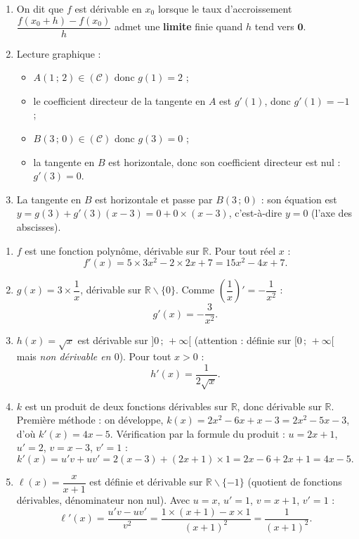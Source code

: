 \documentclass[11pt]{article}
\def\setminus{\mathbin{\backslash}}\let\smallsetminus\setminus
\begin{document}
\begin{corrige}
\begin{enumerate}
\item On dit que $f$ est dérivable en $x_0$ lorsque le taux d'accroissement $\dfrac{f(x_0+h)-f(x_0)}{h}$ admet une \textbf{limite} finie quand $h$ tend vers $\mathbf{0}$.
\item Lecture graphique :
\begin{itemize}
\item $A(1\,;\,2)\in(\mathcal{C})$ donc $g(1)=2$ ;
\item le coefficient directeur de la tangente en $A$ est $g'(1)$, donc $g'(1)=-1$ ;
\item $B(3\,;\,0)\in(\mathcal{C})$ donc $g(3)=0$ ;
\item la tangente en $B$ est horizontale, donc son coefficient directeur est nul : $g'(3)=0$.
\end{itemize}
\item La tangente en $B$ est horizontale et passe par $B(3\,;\,0)$ : son équation est $y=g(3)+g'(3)(x-3)=0+0\times(x-3)$, c'est-à-dire $\boxed{y=0}$ (l'axe des abscisses).
\end{enumerate}
\end{corrige}

\begin{corrige}
\begin{enumerate}
\item $f$ est une fonction polynôme, dérivable sur $\mathbb{R}$. Pour tout réel $x$ :
\[ f'(x)=5\times 3x^2-2\times 2x+7=15x^2-4x+7. \]
\item $g(x)=3\times\dfrac{1}{x}$, dérivable sur $\mathbb{R}\setminus\{0\}$. Comme $\left(\dfrac{1}{x}\right)'=-\dfrac{1}{x^2}$ :
\[ g'(x)=-\dfrac{3}{x^2}. \]
\item $h(x)=\sqrt{x}$ est dérivable sur $]0\,;\,+\infty[$ (attention : définie sur $[0\,;\,+\infty[$ mais \emph{non dérivable en $0$}). Pour tout $x>0$ :
\[ h'(x)=\dfrac{1}{2\sqrt{x}}. \]
\item $k$ est un produit de deux fonctions dérivables sur $\mathbb{R}$, donc dérivable sur $\mathbb{R}$. Première méthode : on développe, $k(x)=2x^2-6x+x-3=2x^2-5x-3$, d'où $k'(x)=4x-5$. Vérification par la formule du produit : $u=2x+1$, $u'=2$, $v=x-3$, $v'=1$ :
\[ k'(x)=u'v+uv'=2(x-3)+(2x+1)\times 1=2x-6+2x+1=4x-5. \]
\item $\ell(x)=\dfrac{x}{x+1}$ est définie et dérivable sur $\mathbb{R}\setminus\{-1\}$ (quotient de fonctions dérivables, dénominateur non nul). Avec $u=x$, $u'=1$, $v=x+1$, $v'=1$ :
\[ \ell'(x)=\frac{u'v-uv'}{v^2}=\frac{1\times(x+1)-x\times 1}{(x+1)^2}=\frac{1}{(x+1)^2}. \]
\end{enumerate}
\end{corrige}
\end{document}
